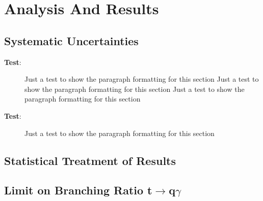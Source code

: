 
\chapter{Analysis And Results}
\label{ch:Results}
\section{Systematic Uncertainties}
\begin{description}
\item[\textbf{Test}:]  Just a test to show the paragraph formatting for this section Just a test to show the paragraph formatting for this section Just a test to show the paragraph formatting for this section
\item[\textbf{Test}:]  Just a test to show the paragraph formatting for this section
\end{description}
\section{Statistical Treatment of Results}

\section{Limit on Branching Ratio t$\rightarrow$q$\gamma$}



